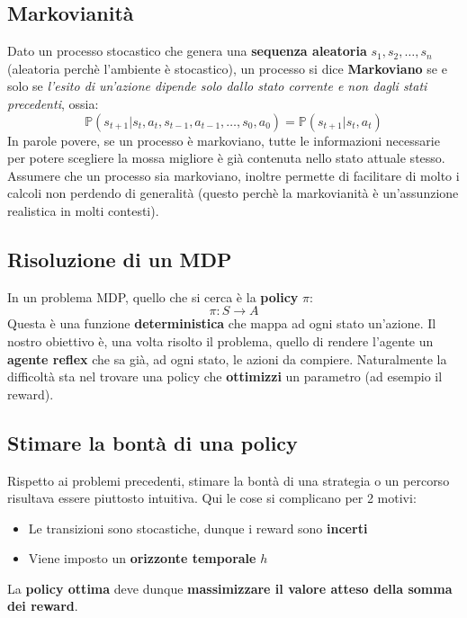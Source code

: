 \subsection{Markovianità}
Dato un processo stocastico che genera una \textbf{sequenza aleatoria} $s_1, s_2, \dots, s_n$ (aleatoria perchè l'ambiente è stocastico),
un processo si dice \textbf{Markoviano} se e solo se \textit{l'esito di un'azione dipende solo dallo stato corrente e non dagli stati precedenti}, ossia:
\begin{equation}
    \mathbb{P}(s_{t+1} | s_t,a_t,s_{t-1},a_{t-1},\dots, s_0, a_0) = \mathbb{P}(s_{t+1} | s_t,a_t)
\end{equation}
In parole povere, se un processo è markoviano, tutte le informazioni necessarie per potere scegliere la mossa migliore è già contenuta nello stato attuale stesso.
Assumere che un processo sia markoviano, inoltre permette di facilitare di molto i calcoli non perdendo di generalità (questo perchè la markovianità è un'assunzione realistica in molti contesti).

\subsection{Risoluzione di un MDP}
In un problema MDP, quello che si cerca è la \textbf{policy} $\pi$:
\begin{equation*}
    \pi : S \rightarrow A
\end{equation*}
Questa è una funzione \textbf{deterministica} che mappa ad ogni stato un'azione. Il nostro obiettivo è, una volta risolto il problema,
quello di rendere l'agente un \textbf{agente reflex} che sa già, ad ogni stato, le azioni da compiere. Naturalmente la difficoltà sta nel 
trovare una policy che \textbf{ottimizzi} un parametro (ad esempio il reward).

\subsection{Stimare la bontà di una policy}
Rispetto ai problemi precedenti, stimare la bontà di una strategia o un percorso risultava essere piuttosto intuitiva. Qui le cose si complicano 
per 2 motivi:
\begin{itemize}
    \item Le transizioni sono stocastiche, dunque i reward sono \textbf{incerti}
    \item Viene imposto un \textbf{orizzonte temporale }$h$
\end{itemize}
La \textbf{policy ottima} deve dunque \textbf{massimizzare il valore atteso della somma dei reward}.
